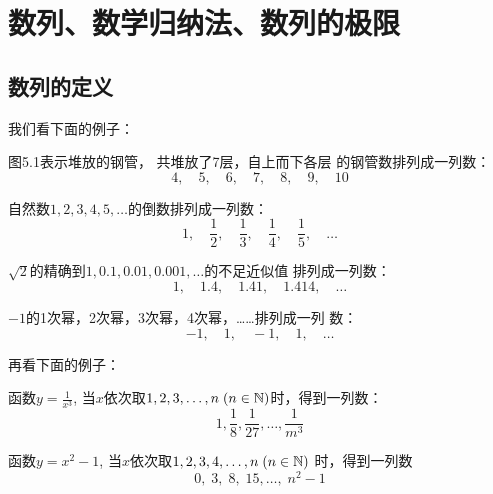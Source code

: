 \chapter{数列、数学归纳法、数列的极限}

\section{数列的定义}

\noindent
\begin{minipage}{.5\textwidth}
    \CTEXindent
我们看下面的例子：

图5.1表示堆放的钢管，
共堆放了7层，自上而下各层
的钢管数排列成一列数：
\[4,\quad 5,\quad 6,\quad 7,\quad 8,\quad 9,\quad 10\]

自然数$1,2,3,4,5,\ldots$的倒数排列成一列数：
\[1,\quad \frac{1}{2},\quad \frac{1}{3},\quad \frac{1}{4},\quad \frac{1}{5},\quad\ldots\]
\end{minipage}\hfill
\begin{minipage}{.4\textwidth}
    \centering
{}

\end{minipage}

$\sqrt{2}$的精确到$1, 0.1, 0.01, 0.001,\ldots$的不足近似值
排列成一列数：
\[1,\quad 1.4,\quad 1.41,\quad 1.414,\quad \ldots\]    

$-1$的1次幂，2次幂，3次幂，4次幂，……排列成一列
数：
\[-1,\quad 1,\quad -1,\quad 1, \quad\ldots\]

再看下面的例子：

函数$y=\frac{1}{x^{3}}$, 当$x$依次取$1,2,3,\ldots,n\; (n\in\mathbb{N})$时，得到一列数：
\[1, \frac 18, \frac {1}{27}, \ldots, \frac {1}{m^{3}}\]

函数$y=x^{2}-1$, 当$x$依次取$1,2,3,4,\ldots,n\; (n\in \mathbb{N})$
时，得到一列数
$$0,\; 3,\; 8,\; 15,\ldots,\; n^{2}-1$$

